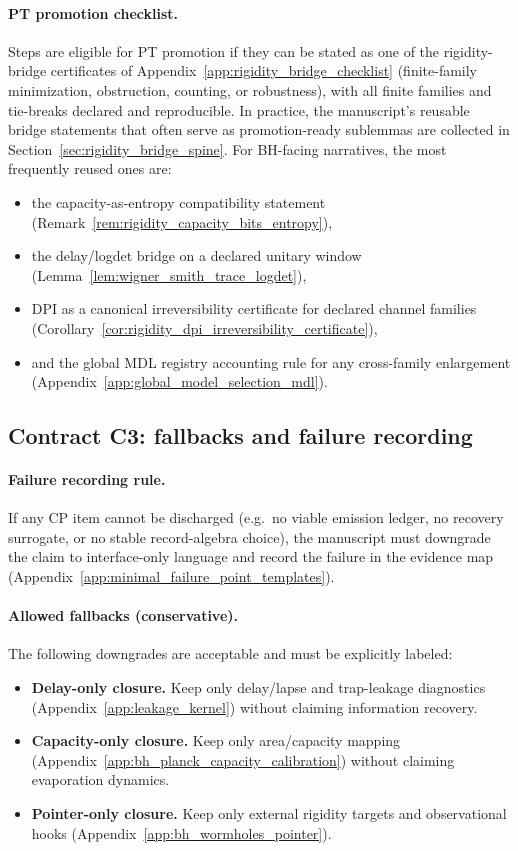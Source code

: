\paragraph{PT promotion checklist.}
\AuditTag Steps are eligible for PT promotion if they can be stated as one of the rigidity-bridge certificates
of Appendix~\ref{app:rigidity_bridge_checklist} (finite-family minimization, obstruction, counting, or robustness),
with all finite families and tie-breaks declared and reproducible.
\AuditTag In practice, the manuscript's reusable bridge statements that often serve as promotion-ready sublemmas are collected in Section~\ref{sec:rigidity_bridge_spine}.
For BH-facing narratives, the most frequently reused ones are:
\begin{itemize}
\item the capacity-as-entropy compatibility statement (Remark~\ref{rem:rigidity_capacity_bits_entropy}),
\item the delay/logdet bridge on a declared unitary window (Lemma~\ref{lem:wigner_smith_trace_logdet}),
\item DPI as a canonical irreversibility certificate for declared channel families (Corollary~\ref{cor:rigidity_dpi_irreversibility_certificate}),
\item and the global MDL registry accounting rule for any cross-family enlargement (Appendix~\ref{app:global_model_selection_mdl}).
\end{itemize}

\subsection{Contract C3: fallbacks and failure recording}
\label{subsec:bh_contract_failures}

\paragraph{Failure recording rule.}
\AuditTag If any CP item cannot be discharged (e.g.\ no viable emission ledger, no recovery surrogate,
or no stable record-algebra choice), the manuscript must downgrade the claim to interface-only language
and record the failure in the evidence map (Appendix~\ref{app:minimal_failure_point_templates}).

\paragraph{Allowed fallbacks (conservative).}
\AuditTag The following downgrades are acceptable and must be explicitly labeled:
\begin{itemize}
\item \textbf{Delay-only closure.} Keep only delay/lapse and trap-leakage diagnostics (Appendix~\ref{app:leakage_kernel})
without claiming information recovery.
\item \textbf{Capacity-only closure.} Keep only area/capacity mapping (Appendix~\ref{app:bh_planck_capacity_calibration})
without claiming evaporation dynamics.
\item \textbf{Pointer-only closure.} Keep only external rigidity targets and observational hooks
(Appendix~\ref{app:bh_wormholes_pointer}).
\end{itemize}

